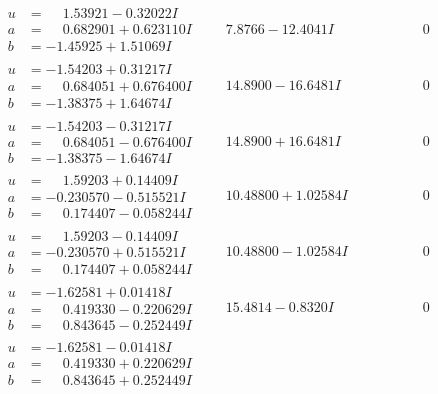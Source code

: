 \documentclass[1p]{elsarticle_modified}
\theoremstyle{definition}
\begin{document}
$$\begin{array}{c|c|c}
\begin{aligned}
u &= \phantom{-}1.53921 - 0.32022 I \\
a &= \phantom{-}0.682901 + 0.623110 I \\
b &= -1.45925 + 1.51069 I\end{aligned}
 & \phantom{-}7.8766 - 12.4041 I & \phantom{-0.000000 } 0 \\ \hline\begin{aligned}
u &= -1.54203 + 0.31217 I \\
a &= \phantom{-}0.684051 + 0.676400 I \\
b &= -1.38375 + 1.64674 I\end{aligned}
 & \phantom{-}14.8900 - 16.6481 I & \phantom{-0.000000 } 0 \\ \hline\begin{aligned}
u &= -1.54203 - 0.31217 I \\
a &= \phantom{-}0.684051 - 0.676400 I \\
b &= -1.38375 - 1.64674 I\end{aligned}
 & \phantom{-}14.8900 + 16.6481 I & \phantom{-0.000000 } 0 \\ \hline\begin{aligned}
u &= \phantom{-}1.59203 + 0.14409 I \\
a &= -0.230570 - 0.515521 I \\
b &= \phantom{-}0.174407 - 0.058244 I\end{aligned}
 & \phantom{-}10.48800 + 1.02584 I & \phantom{-0.000000 } 0 \\ \hline\begin{aligned}
u &= \phantom{-}1.59203 - 0.14409 I \\
a &= -0.230570 + 0.515521 I \\
b &= \phantom{-}0.174407 + 0.058244 I\end{aligned}
 & \phantom{-}10.48800 - 1.02584 I & \phantom{-0.000000 } 0 \\ \hline\begin{aligned}
u &= -1.62581 + 0.01418 I \\
a &= \phantom{-}0.419330 - 0.220629 I \\
b &= \phantom{-}0.843645 - 0.252449 I\end{aligned}
 & \phantom{-}15.4814 - 0.8320 I & \phantom{-0.000000 } 0 \\ \hline\begin{aligned}
u &= -1.62581 - 0.01418 I \\
a &= \phantom{-}0.419330 + 0.220629 I \\
b &= \phantom{-}0.843645 + 0.252449 I\end{aligned}

\end{array}$$
\end{document}

